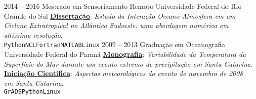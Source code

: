 \documentclass[9pt]{developercv} %
\begin{document}
\vspace{-0.5cm}

\begin{entrylist}
		\entry
		{2014 -- 2016}
		{Mestrado em Sensoriamento Remoto}
		{Universidade Federal do Rio Grande do Sul}
		{\href{https://lume.ufrgs.br/handle/10183/171223}{\textcolor{bleu_cite}{\textbf{Dissertação}}}: \textit{Estudo da Interação Oceano-Atmosfera em um Ciclone Extratropical no Atlântico Sudoeste: uma abordagem numérica em altíssima resolução}. \\  \texttt{Python}\slashsep\texttt{NCL}\slashsep\texttt{Fortran}\slashsep\texttt{MATLAB}\slashsep\texttt{Linux}}
	\entry
		{2009 -- 2013}
		{Graduação em Oceanografia}
		{Universidade Federal do Paraná}
		{\href{http://doi.org/10.13140/RG.2.2.15184.35847}{\textcolor{bleu_cite}{\textbf{Monografia}}}: \textit{Variabilidade da Temperatura da Superfície do Mar durante um evento extremo de precipitação em Santa Catarina}. 
		\\ \href{http://doi.org/10.13140/RG.2.2.25250.68800}{\textcolor{bleu_cite}{\textbf{Iniciação Científica}}}: \textit{Aspectos meteorológicos do evento de novembro de 2008 em Santa Catarina}.
		\\\texttt{GrADS}\slashsep\texttt{Python}\slashsep\texttt{Linux}}
\end{entrylist}

\vspace{-0.4cm}
\end{document}
